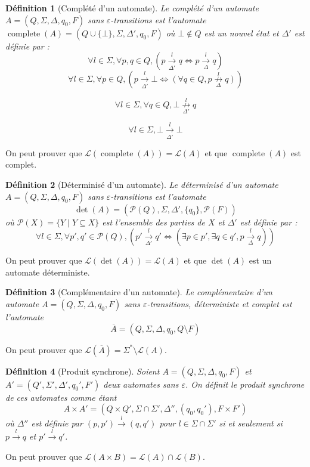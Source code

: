 \documentclass[10pt,a4paper]{article}
\newtheorem{mydef}{D\'efinition}
\begin{document}
\begin{mydef}[Compl\'et\'e d'un automate]
Le compl\'et\'e d'un automate $A = (Q, \Sigma, \Delta, q_0, F)$ sans $\varepsilon$-transitions est l'automate $\operatorname{complete}(A) = (Q\cup\{\bot\}, \Sigma, \Delta', q_0, F)$ o\`u $\bot\not\in Q$ est un nouvel \'etat et $\Delta'$ est d\'efinie par :
$$\forall l \in \Sigma,\forall p,q \in Q, \left(p\underset{\Delta'}{\overset{l}{{\to}}}q \iff p\underset{\Delta}{\overset{l}{{\to}}}q\right)$$
$$\forall l \in \Sigma, \forall p \in Q, \left(p\underset{\Delta'}{\overset{l}{{\to}}}\bot \iff \left(\forall q \in Q, p\underset{\Delta}{\overset{l}{{\not\to}}}q\right)\right)$$

$$\forall l \in \Sigma, \forall q \in Q,\bot\underset{\Delta'}{\overset{l}{{\not\to}}}q$$

$$\forall l \in \Sigma, \bot\underset{\Delta'}{\overset{l}{{\to}}}\bot$$
\end{mydef}

On peut prouver que $\mathcal L(\operatorname{complete}(A)) = \mathcal L(A)$ et que $\operatorname{complete}(A)$ est complet.

\begin{mydef}[D\'eterminis\'e d'un automate]
Le d\'eterminis\'e d'un automate $A = (Q, \Sigma, \Delta, q_0, F)$ sans $\varepsilon$-transitions est l'automate $$\det(A) = (\mathcal P(Q), \Sigma, \Delta', \{q_0\}, \mathcal P(F))$$ o\`u $\mathcal P(X)=\{Y\mid Y \subseteq X\}$ est l'ensemble des parties de $X$ et $\Delta'$ est d\'efinie par :
$$\forall l \in \Sigma,\forall p',q' \in \mathcal P(Q), \left(p'\underset{\Delta'}{\overset{l}{{\to}}}q' \iff \left( \exists p \in p', \exists q \in q', p\underset{\Delta}{\overset{l}{{\to}}}q\right)\right)$$
\end{mydef}

On peut prouver que $\mathcal L(\det(A))=\mathcal L(A)$ et que $\det(A)$ est un automate d\'eterministe.

\begin{mydef}[Compl\'ementaire d'un automate]
Le compl\'ementaire d'un automate $A = (Q, \Sigma, \Delta, q_0, F)$ sans $\varepsilon$-transitions, d\'eterministe et complet est l'automate $$\overline{A} = (Q, \Sigma, \Delta, q_0, Q\setminus F)$$
\end{mydef}

On peut prouver que $\mathcal L\left(\overline{A}\right) = \Sigma^* \setminus \mathcal L(A)$.

\begin{mydef}[Produit synchrone]
Soient $A = (Q, \Sigma, \Delta, q_0, F)$ et $A' = (Q', \Sigma', \Delta', q_0', F')$ deux automates sans $\varepsilon$. On définit le produit synchrone de ces automates comme \'etant $$A\times A' = (Q \times Q', \Sigma \cap \Sigma', \Delta'', (q_0, q_0'), F\times F')$$ o\`u $\Delta''$ est d\'efinie par $(p,p')\overset{l}{{\to}}(q,q')$ pour $l\in \Sigma\cap \Sigma'$ si et seulement si $p\overset{l}{{\to}}q$ et $p'\overset{l}{{\to}}q'$.
\end{mydef}
On peut prouver que $\mathcal L(A\times B) = \mathcal L(A) \cap \mathcal L(B)$.
\end{document}
